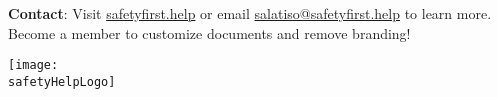 \documentclass[11pt]{article}
\newcommand{\safetyHelpLogo}{/safety-plans/assets/images/logo.png}
\newcommand{\safetyHelpLogo}{/safety-plans/assets/images/logo.png}
\begin{document}
{  \textbf{Contact}: Visit \href{https://safetyfirst.help}{safetyfirst.help} or email \href{mailto:salatiso@safetyfirst.help}{salatiso@safetyfirst.help} to learn more. Become a member to customize documents and remove branding!

  \vspace{2cm}
  \hfill \texttt{[image: \\safetyHelpLogo]}
}{}

\label{LastPage}
\end{document}
